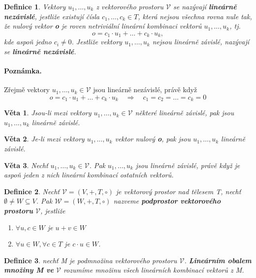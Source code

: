 \documentclass[12pt,a4paper]{article}
\newtheorem{definition}{Definice}
\newtheorem{sentence}{Věta}
\begin{document}
\begin{definition}
	Vektory $u_1, \dots, u_k$ z vektorového prostoru $\mathscr{V}$ se nazývají \textbf{lineárně nezávislé}, jestliže existují čísla $c_1, \dots, c_k \in T$, která nejsou všechna rovna nule tak, že nulový vektor \textbf{o} je roven netriviální lineární kombinaci vektorů $u_1, \dots, u_k$, tj. $$o = c_1 \cdot u_1 + \dots + c_k \cdot u_k,$$
	kde aspoň jedno $c_i \not= 0$. Jestliže vektory $u_1, \dots, u_k$ nejsou lineárně závislé, nazývají se \textbf{lineárně nezávislé}.
\end{definition}

\paragraph{Poznámka.} Zřejmě vektory  $u_1, \dots, u_k \in \mathscr{V}$ jsou lineárně nezávislé, právě když $$o = c_1 \cdot u_1 +  \dots + c_k \cdot u_k \quad \Rightarrow \quad c_1 = c_2 = \dots = c_k = 0$$

\begin{sentence}
	Jsou-li mezi vektory  $u_1, \dots, u_k \in \mathscr{V}$  některé lineárně závislé, pak jsou  $u_1, \dots, u_k$ lineárně závislé.
\end{sentence}

\begin{sentence}
	Je-li mezi vektory  $u_1, \dots, u_k$  vektor nulový \textbf{o}, pak jsou $u_1, \dots, u_k$ lineárně závislé.
\end{sentence}

\begin{sentence}
	Nechť $u_1, \dots, u_k \in \mathscr{V}$. Pak  $u_1, \dots, u_k$ jsou lineárně závislé, právě když je aspoň jeden z nich lineární kombinací ostatních vektorů.
\end{sentence}

\begin{definition}
	Nechť  $\mathscr{V} = (V, +, T, \circ)$  je vektorový prostor nad tělesem T, nechť $\emptyset \not= W \subseteq V$. Pak  $\mathscr{W} = (W, +, T, \circ)$ nazveme \textbf{podprostor vektorového prostoru} $\mathscr{V}$, jestliže
	\begin{enumerate}
		\item $\forall u,c \in W$ je $u + v \in W$
		\item $\forall u \in W, \forall c \in T$ je $c \cdot u \in W$.
	\end{enumerate}
\end{definition}


\begin{definition}
	nechť M je podmnožina vektorového prostoru $\mathscr{V}$. \textbf{Lineárním obalem množiny M ve} $\mathscr{V}$ rozumíme množinu všech lineárních kombinací vektorů z M.
\end{definition}
\end{document}
